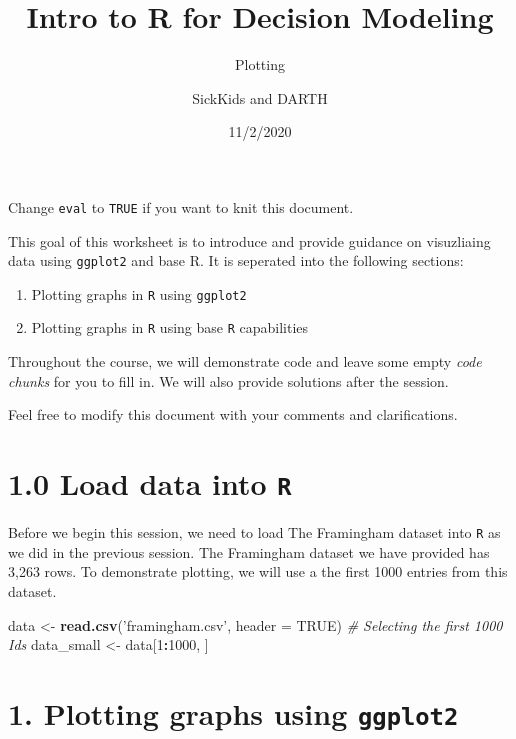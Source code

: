 \documentclass[
]{article}
\title{Intro to R for Decision Modeling}
\subtitle{Plotting}
\author{SickKids and DARTH}
\date{11/2/2020}
\newenvironment{Shaded}{\begin{snugshade}}{\end{snugshade}}
\newcommand{\CommentTok}[1]{\textcolor[rgb]{0.56,0.35,0.01}{\textit{#1}}}
\newcommand{\DataTypeTok}[1]{\textcolor[rgb]{0.13,0.29,0.53}{#1}}
\newcommand{\DecValTok}[1]{\textcolor[rgb]{0.00,0.00,0.81}{#1}}
\newcommand{\KeywordTok}[1]{\textcolor[rgb]{0.13,0.29,0.53}{\textbf{#1}}}
\newcommand{\NormalTok}[1]{#1}
\newcommand{\OperatorTok}[1]{\textcolor[rgb]{0.81,0.36,0.00}{\textbf{#1}}}
\newcommand{\OtherTok}[1]{\textcolor[rgb]{0.56,0.35,0.01}{#1}}
\newcommand{\StringTok}[1]{\textcolor[rgb]{0.31,0.60,0.02}{#1}}
\begin{document}
\maketitle

Change \texttt{eval} to \texttt{TRUE} if you want to knit this document.

This goal of this worksheet is to introduce and provide guidance on
visuzliaing data using \texttt{ggplot2} and base R. It is seperated into
the following sections:

\begin{enumerate}
\def\labelenumi{\arabic{enumi}.}
\item
  Plotting graphs in \texttt{R} using \texttt{ggplot2}
\item
  Plotting graphs in \texttt{R} using base \texttt{R} capabilities
\end{enumerate}

Throughout the course, we will demonstrate code and leave some empty
\emph{code chunks} for you to fill in. We will also provide solutions
after the session.

Feel free to modify this document with your comments and clarifications.

\hypertarget{load-data-into-r}{%
\section{\texorpdfstring{1.0 Load data into
\texttt{R}}{1.0 Load data into R}}\label{load-data-into-r}}

Before we begin this session, we need to load The Framingham dataset
into \texttt{R} as we did in the previous session. The Framingham
dataset we have provided has 3,263 rows. To demonstrate plotting, we
will use a the first 1000 entries from this dataset.

\begin{Shaded}
\begin{Highlighting}[]
\NormalTok{data <-}\StringTok{ }\KeywordTok{read.csv}\NormalTok{(}\StringTok{'framingham.csv'}\NormalTok{, }\DataTypeTok{header =} \OtherTok{TRUE}\NormalTok{)}
\CommentTok{# Selecting the first 1000 Ids}
\NormalTok{data_small <-}\StringTok{ }\NormalTok{data[}\DecValTok{1}\OperatorTok{:}\DecValTok{1000}\NormalTok{, ]}
\end{Highlighting}
\end{Shaded}

\hypertarget{plotting-graphs-using-ggplot2}{%
\section{\texorpdfstring{1. Plotting graphs using
\texttt{ggplot2}}{1. Plotting graphs using ggplot2}}\label{plotting-graphs-using-ggplot2}}
\end{document}

